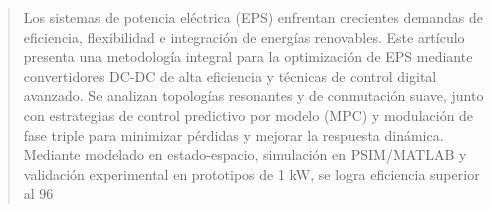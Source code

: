 \begin{abstract}
Los sistemas de potencia eléctrica (EPS) enfrentan crecientes demandas de eficiencia, flexibilidad e integración de energías renovables. Este artículo presenta una metodología integral para la optimización de EPS mediante convertidores DC-DC de alta eficiencia y técnicas de control digital avanzado. Se analizan topologías resonantes y de conmutación suave, junto con estrategias de control predictivo por modelo (MPC) y modulación de fase triple para minimizar pérdidas y mejorar la respuesta dinámica. Mediante modelado en estado-espacio, simulación en PSIM/MATLAB y validación experimental en prototipos de 1 kW, se logra eficiencia superior al 96%
\end{abstract}